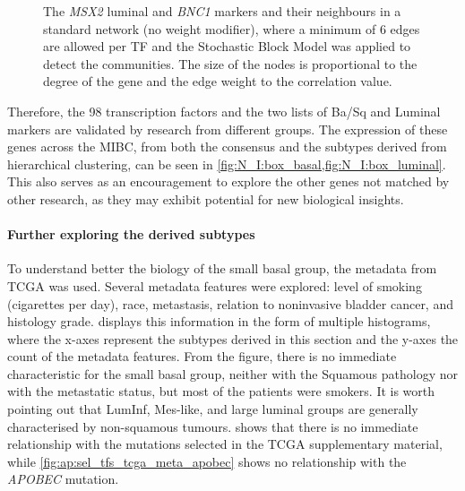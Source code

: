 \begin{figure}[H]
    \caption{The \textit{MSX2} luminal and \textit{BNC1} markers and their neighbours in a standard network (no weight modifier), where a minimum of 6 edges are allowed per TF and the Stochastic Block Model was applied to detect the communities. The size of the nodes is proportional to the degree of the gene and the edge weight to the correlation value.}
    
    \label{fig:N_I:net_neighbours}
\end{figure}



Therefore, the 98 transcription factors and the two lists of Ba/Sq and Luminal markers are validated by research from different groups. The expression of these genes across the MIBC, from both the consensus and the subtypes derived from hierarchical clustering, can be seen in \cref{fig:N_I:box_basal,fig:N_I:box_luminal}. This also serves as an encouragement to explore the other genes not matched by other research, as they may exhibit potential for new biological insights.

\paragraph*{Further exploring the derived subtypes} \label{s:N_I:sel_tfs_subtypes}

To understand better the biology of the small basal group, the metadata from TCGA \citet{Robertson2017-mg} was used. Several metadata features were explored: level of smoking (cigarettes per day), race, metastasis, relation to noninvasive bladder cancer, and histology grade.  displays this information in the form of multiple histograms, where the x-axes represent the subtypes derived in this section and the y-axes the count of the metadata features. From the figure, there is no immediate characteristic for the small basal group, neither with the Squamous pathology nor with the metastatic status, but most of the patients were smokers. It is worth pointing out that LumInf, Mes-like, and large luminal groups are generally characterised by non-squamous tumours.  shows that there is no immediate relationship with the mutations selected in the TCGA supplementary material, while \cref{fig:ap:sel_tfs_tcga_meta_apobec} shows no relationship with the \textit{APOBEC} mutation.

